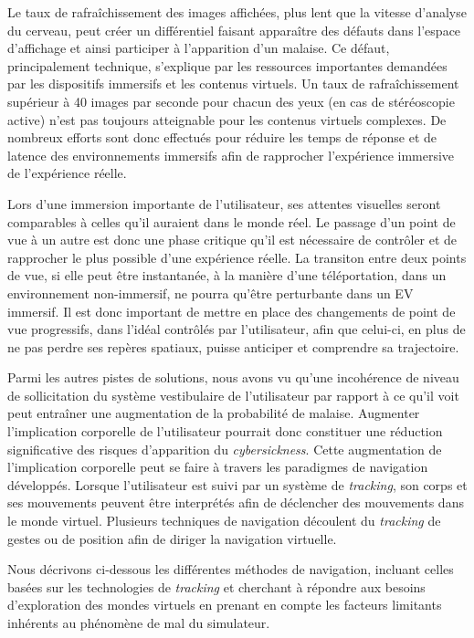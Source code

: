 Le taux de rafraîchissement des images affichées, plus lent que la vitesse d'analyse du cerveau, peut créer un différentiel faisant apparaître des défauts dans l'espace d'affichage et ainsi participer à l'apparition d'un malaise. Ce défaut, principalement technique, s'explique par les ressources importantes demandées par les dispositifs immersifs et les contenus virtuels. Un taux de rafraîchissement supérieur à 40 images par seconde pour chacun des yeux (en cas de stéréoscopie active) n'est pas toujours atteignable pour les contenus virtuels complexes. De nombreux efforts sont donc effectués pour réduire les temps de réponse et de latence des environnements immersifs afin de rapprocher l'expérience immersive de l'expérience réelle.

Lors d'une immersion importante de l'utilisateur, ses attentes visuelles seront comparables à celles qu'il auraient dans le monde réel. Le passage d'un point de vue à un autre est donc une phase critique qu'il est nécessaire de contrôler et de rapprocher le plus possible d'une expérience réelle. La transiton entre deux points de vue, si elle peut être instantanée, à la manière d'une téléportation, dans un environnement non-immersif, ne pourra qu'être perturbante dans un EV immersif. Il est donc important de mettre en place des changements de point de vue progressifs, dans l'idéal contrôlés par l'utilisateur, afin que celui-ci, en plus de ne pas perdre ses repères spatiaux, puisse anticiper et comprendre sa trajectoire.

Parmi les autres pistes de solutions, nous avons vu qu'une incohérence de niveau de sollicitation du système vestibulaire de l'utilisateur par rapport à ce qu'il voit peut entraîner une augmentation de la probabilité de malaise. Augmenter l'implication corporelle de l'utilisateur pourrait donc constituer une réduction significative des risques d'apparition du \textit{cybersickness}. Cette augmentation de l'implication corporelle peut se faire à travers les paradigmes de navigation développés. Lorsque l'utilisateur est suivi par un système de \textit{tracking}, son corps et ses mouvements peuvent être interprétés afin de déclencher des mouvements dans le monde virtuel. Plusieurs techniques de navigation découlent du \textit{tracking} de gestes ou de position afin de diriger la navigation virtuelle.

Nous décrivons ci-dessous les différentes méthodes de navigation, incluant celles basées sur les technologies de \textit{tracking} et cherchant à répondre aux besoins d'exploration des mondes virtuels en prenant en compte les facteurs limitants inhérents au phénomène de mal du simulateur.



